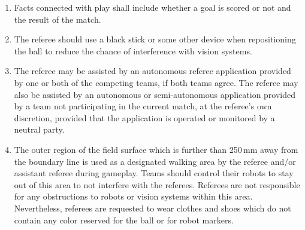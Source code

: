 \begin{enumerate}
\item
Facts connected with play shall include whether a goal is scored or not and the result of the match.

\item
The referee should use a black stick or some other device when repositioning the ball to reduce the chance of interference with vision systems.

\item
The referee may be assisted by an autonomous referee application provided by
one or both of the competing teams, if both teams agree. The referee may
also be assisted by an autonomous or semi-autonomous application provided
 by a team not participating in the current
match, at the referee's own discretion, provided that the application is
operated or monitored by a neutral party.

\item
The outer region of the field surface which is further than 250\,mm away from the boundary line is used as a designated walking area by the referee and/or assistant referee during gameplay.
Teams should control their robots to stay out of this area to not interfere with the referees.
Referees are not responsible for any obstructions to robots or vision systems within this area.
Nevertheless, referees are requested to wear clothes and shoes which do not contain any color reserved for the ball or for robot markers.

\end{enumerate}
